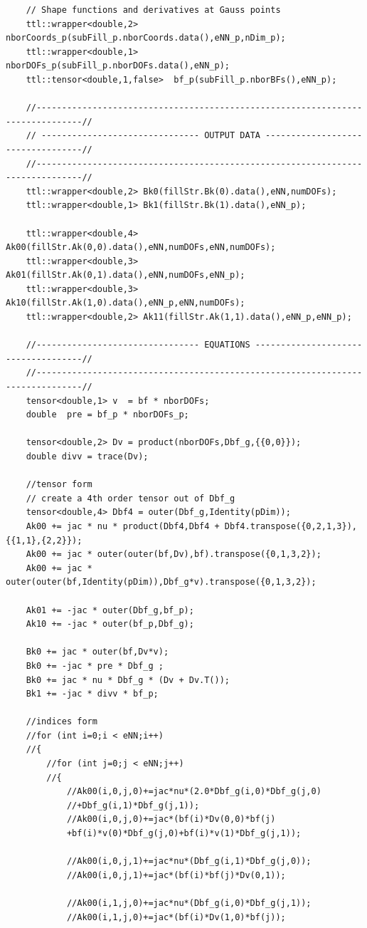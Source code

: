 \documentclass[]{article}
\begin{document}
\begin{lstlisting}
	// Shape functions and derivatives at Gauss points
	ttl::wrapper<double,2> nborCoords_p(subFill_p.nborCoords.data(),eNN_p,nDim_p);
	ttl::wrapper<double,1> nborDOFs_p(subFill_p.nborDOFs.data(),eNN_p);
	ttl::tensor<double,1,false>  bf_p(subFill_p.nborBFs(),eNN_p);
	
	//-------------------------------------------------------------------------------//
	// ------------------------------- OUTPUT DATA ----------------------------------//
	//-------------------------------------------------------------------------------//
	ttl::wrapper<double,2> Bk0(fillStr.Bk(0).data(),eNN,numDOFs);
	ttl::wrapper<double,1> Bk1(fillStr.Bk(1).data(),eNN_p);
	
	ttl::wrapper<double,4> Ak00(fillStr.Ak(0,0).data(),eNN,numDOFs,eNN,numDOFs);
	ttl::wrapper<double,3> Ak01(fillStr.Ak(0,1).data(),eNN,numDOFs,eNN_p);
	ttl::wrapper<double,3> Ak10(fillStr.Ak(1,0).data(),eNN_p,eNN,numDOFs);
	ttl::wrapper<double,2> Ak11(fillStr.Ak(1,1).data(),eNN_p,eNN_p);
	
	//-------------------------------- EQUATIONS ------------------------------------//
	//-------------------------------------------------------------------------------//
	tensor<double,1> v  = bf * nborDOFs;
	double  pre = bf_p * nborDOFs_p;
	
	tensor<double,2> Dv = product(nborDOFs,Dbf_g,{{0,0}});
	double divv = trace(Dv);
	
	//tensor form
	// create a 4th order tensor out of Dbf_g
	tensor<double,4> Dbf4 = outer(Dbf_g,Identity(pDim));
	Ak00 += jac * nu * product(Dbf4,Dbf4 + Dbf4.transpose({0,2,1,3}),{{1,1},{2,2}});
	Ak00 += jac * outer(outer(bf,Dv),bf).transpose({0,1,3,2});
	Ak00 += jac * outer(outer(bf,Identity(pDim)),Dbf_g*v).transpose({0,1,3,2});
	
	Ak01 += -jac * outer(Dbf_g,bf_p);
	Ak10 += -jac * outer(bf_p,Dbf_g);
	
	Bk0 += jac * outer(bf,Dv*v);
	Bk0 += -jac * pre * Dbf_g ;
	Bk0 += jac * nu * Dbf_g * (Dv + Dv.T());
	Bk1 += -jac * divv * bf_p;
	
	//indices form
	//for (int i=0;i < eNN;i++)
	//{
		//for (int j=0;j < eNN;j++)
		//{
			//Ak00(i,0,j,0)+=jac*nu*(2.0*Dbf_g(i,0)*Dbf_g(j,0)
			//+Dbf_g(i,1)*Dbf_g(j,1));
			//Ak00(i,0,j,0)+=jac*(bf(i)*Dv(0,0)*bf(j)
			+bf(i)*v(0)*Dbf_g(j,0)+bf(i)*v(1)*Dbf_g(j,1));
			
			//Ak00(i,0,j,1)+=jac*nu*(Dbf_g(i,1)*Dbf_g(j,0));
			//Ak00(i,0,j,1)+=jac*(bf(i)*bf(j)*Dv(0,1));
			
			//Ak00(i,1,j,0)+=jac*nu*(Dbf_g(i,0)*Dbf_g(j,1));
			//Ak00(i,1,j,0)+=jac*(bf(i)*Dv(1,0)*bf(j));
			

\end{lstlisting}
\end{document}
